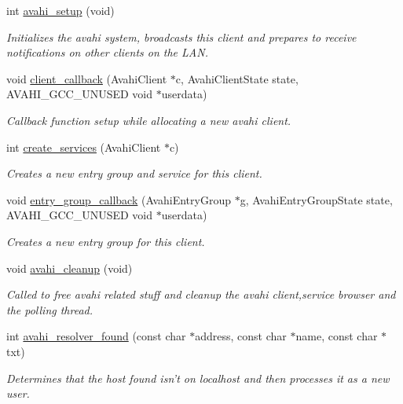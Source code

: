 \begin{DoxyCompactItemize}
\item 
int \hyperlink{avahi-discovery_8h_ab6b27b0e371ca0b376eb974f375ff5ca}{avahi\-\_\-setup} (void)
\begin{DoxyCompactList}\small\item\em \-Initializes the avahi system, broadcasts this client and prepares to receive notifications on other clients on the \-L\-A\-N. \end{DoxyCompactList}\item 
void \hyperlink{avahi-discovery_8h_a5737f6f987251a326e517df2e46798e2}{client\-\_\-callback} (\-Avahi\-Client $\ast$c, \-Avahi\-Client\-State state, \-A\-V\-A\-H\-I\-\_\-\-G\-C\-C\-\_\-\-U\-N\-U\-S\-E\-D void $\ast$userdata)
\begin{DoxyCompactList}\small\item\em \-Callback function setup while allocating a new avahi client. \end{DoxyCompactList}\item 
int \hyperlink{avahi-discovery_8h_a9ba82854f49f859a54be8e85a44adebf}{create\-\_\-services} (\-Avahi\-Client $\ast$c)
\begin{DoxyCompactList}\small\item\em \-Creates a new entry group and service for this client. \end{DoxyCompactList}\item 
void \hyperlink{avahi-discovery_8h_a06c4f33a522276419bbfe69fe8c64b34}{entry\-\_\-group\-\_\-callback} (\-Avahi\-Entry\-Group $\ast$g, \-Avahi\-Entry\-Group\-State state, \-A\-V\-A\-H\-I\-\_\-\-G\-C\-C\-\_\-\-U\-N\-U\-S\-E\-D void $\ast$userdata)
\begin{DoxyCompactList}\small\item\em \-Creates a new entry group for this client. \end{DoxyCompactList}\item 
void \hyperlink{avahi-discovery_8h_a2b2ee856af615d834ad55488d0cdf413}{avahi\-\_\-cleanup} (void)
\begin{DoxyCompactList}\small\item\em \-Called to free avahi related stuff and cleanup the avahi client,service browser and the polling thread. \end{DoxyCompactList}\item 
int \hyperlink{avahi-discovery_8h_aa3f6429c6ea796f2e6917ae703c82a75}{avahi\-\_\-resolver\-\_\-found} (const char $\ast$address, const char $\ast$name, const char $\ast$txt)
\begin{DoxyCompactList}\small\item\em \-Determines that the host found isn't on localhost and then processes it as a new user. \end{DoxyCompactList}\item 

\end{DoxyCompactItemize}
